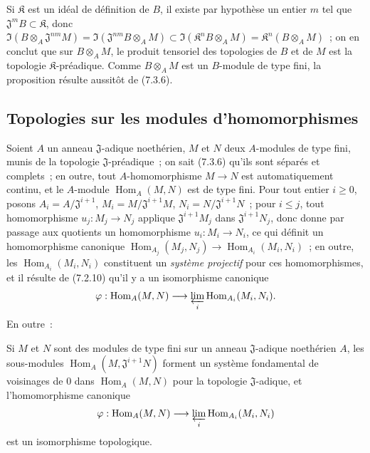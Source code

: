 Si $\mathfrak K$ est un idéal de définition de $B$, il existe par hypothèse
un entier $m$ tel que $\mathfrak J^mB\subset\mathfrak K$, donc
$\Im(B\otimes_A\mathfrak J^{nm}M)=
\Im(\mathfrak J^{nm}B\otimes_A M)\subset
\Im(\mathfrak K^nB\otimes_A M)=\mathfrak K^n(B\otimes_A M)$~; on en
conclut que sur $B\otimes_A M$, le produit tensoriel des topologies de $B$
et de $M$ est la topologie $\mathfrak K$-préadique. Comme $B\otimes_A M$
est un $B$-module de type fini, la proposition résulte aussitôt de (7.3.6).

\subsection{Topologies sur les modules d'homomorphismes}
\label{subsection:0.7.8-fr}

\begin{env}[7.8.1]
\label{0.7.8.1-fr}
Soient $A$ un anneau $\mathfrak J$-adique noethérien, $M$ et $N$ deux
$A$-modules de type fini, munis de la topologie $\mathfrak J$-préadique~;
on sait (7.3.6) qu'ils sont séparés et complets~; en outre, tout
$A$-homomorphisme $M\to N$ est automatiquement continu, et le $A$-module
$\operatorname{Hom}_A(M,N)$ est de type fini. Pour tout entier $i\geq 0$, posons
$A_i=A/\mathfrak J^{i+1}$, $M_i=M/\mathfrak J^{i+1}M$,
$N_i=N/\mathfrak J^{i+1}N$~; pour $i\leq j$, tout homomorphisme
$u_j:M_j\to N_j$ applique $\mathfrak J^{i+1}M_j$ dans
$\mathfrak J^{i+1}N_j$, donc donne par passage aux quotients un
homomorphisme $u_i:M_i\to N_i$, ce qui définit un homomorphisme canonique
$\operatorname{Hom}_{A_j}(M_j,N_j)\to\operatorname{Hom}_{A_i}(M_i,N_i)$~; en outre, les
$\operatorname{Hom}_{A_i}(M_i,N_i)$ constituent un \emph{système projectif} pour ces
homomorphismes, et il résulte de (7.2.10) qu'il y a un isomorphisme
canonique
\[
  \varphi:\operatorname{Hom}_A(M,N)\longrightarrow
  \varprojlim_i\operatorname{Hom}_{A_i}(M_i,N_i).
\]
En outre~:
\end{env}

\begin{proposition}[7.8.2]
\label{0.7.8.2-fr}
Si $M$ et $N$ sont des modules de type fini sur un anneau $\mathfrak J$-adique
noethérien $A$, les sous-modules $\operatorname{Hom}_A(M,\mathfrak J^{i+1}N)$ forment un
système fondamental de voisinages de $0$ dans $\operatorname{Hom}_A(M,N)$ pour la
topologie $\mathfrak J$-adique, et l'homomorphisme canonique
\[
  \varphi:\operatorname{Hom}_A(M,N)\longrightarrow
  \varprojlim_i\operatorname{Hom}_{A_i}(M_i,N_i)
\]
est un isomorphisme topologique.
\end{proposition}

